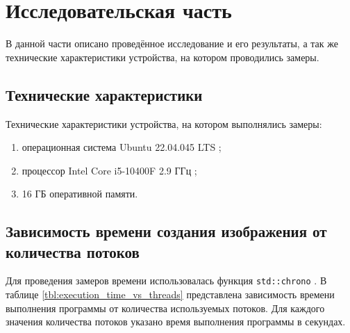 



\chapter{Исследовательская часть}
В данной части описано проведённое исследование и его результаты,
а так же технические характеристики устройства, на котором проводились
замеры.

\section{Технические характеристики}
Технические характеристики устройства, на котором выполнялись
замеры:
\begin{enumerate}
\item операционная система Ubuntu 22.04.045 LTS \cite{Ubuntu};
\item процессор Intel Core i5-10400F 2.9 ГГц \cite{Intel};
\item 16 ГБ оперативной памяти.
\end{enumerate}

\section{Зависимость времени создания изображения от количества потоков}
Для проведения замеров времени использовалась функция \texttt{std::chrono} \cite{Chrono}.
В таблице \ref{tbl:execution_time_vs_threads} представлена зависимость времени выполнения программы от количества используемых потоков. Для каждого значения количества потоков указано время выполнения программы в секундах.

